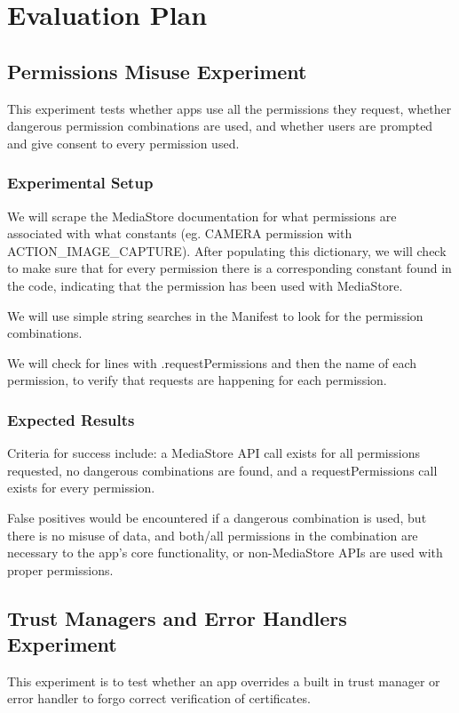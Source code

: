 \documentclass[10pt,twocolumn,pdftex]{article}
\begin{document}
\section{Evaluation Plan}


\subsection{Permissions Misuse Experiment}

    This experiment tests whether apps use all the permissions they request, whether dangerous permission combinations are used, and whether users are prompted and give consent to every permission used.

    \subsubsection{Experimental Setup}
    We will scrape the MediaStore documentation for what permissions are associated with what constants (eg. CAMERA permission with ACTION\_IMAGE\_CAPTURE). After populating this dictionary, we will check to make sure that for every permission there is a corresponding constant found in the code, indicating that the permission has been used with MediaStore.

    We will use simple string searches in the Manifest to look for the permission combinations. 

    We will check for lines with .requestPermissions and then the name of each permission, to verify that requests are happening for each permission.

    \subsubsection{Expected Results}

    Criteria for success include:
    a MediaStore API call exists for all permissions requested, 
    no dangerous combinations are found, and
    a requestPermissions call exists for every permission.

    False positives would be encountered if 
    a dangerous combination is used, but there is no misuse of data, and both/all permissions in the combination are necessary to the app’s core functionality, or 
    non-MediaStore APIs are used with proper permissions.


\subsection{Trust Managers and Error Handlers Experiment}
    This experiment is to test whether an app overrides a built in trust manager or error handler to forgo correct verification of certificates. 
\end{document}
